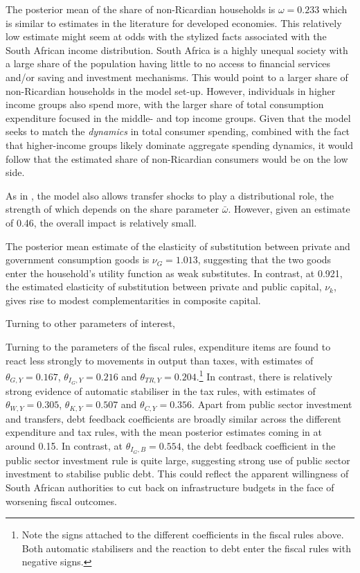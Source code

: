 \documentclass[a4paper,11pt]{article}
\numberwithin{equation}{section}
\begin{document}
	The posterior mean of the share of non-Ricardian households is $\omega=0.233$ which is similar to estimates in the literature for developed economies. This relatively low estimate might seem at odds with the stylized facts associated with the South African income distribution. South Africa is a highly unequal society with a large share of the population having little to no access to financial services and/or saving and investment mechanisms. This would point to a larger share of non-Ricardian households in the model set-up. However, individuals in higher income groups also spend more, with the larger share of total consumption expenditure focused in the middle- and top income groups. Given that the model seeks to match the \textit{dynamics} in total consumer spending, combined with the fact that higher-income groups likely dominate aggregate spending dynamics, it would follow that the estimated share of non-Ricardian consumers would be on the low side.
	
	As in \cite{coenen2013}, the model also allows transfer shocks to play a distributional role, the strength of which depends on the share parameter $\bar{\omega}$. However, given an estimate of 0.46, the overall impact is relatively small.
	
	The posterior mean estimate of the elasticity of substitution between private and government consumption goods is $\nu_G = 1.013$, suggesting that the two goods enter the household's utility function as weak substitutes. In contrast, at 0.921, the estimated elasticity of substitution between private and public capital, $\nu_k$, gives rise to modest complementarities in composite capital.    
	
	Turning to other parameters of interest, 
	
	Turning to the parameters of the fiscal rules, expenditure items are found to react less strongly to movements in output than taxes, with estimates of $\theta_{G,Y}=0.167$, $\theta_{I_G,Y}=0.216$ and $\theta_{TR,Y}=0.204$.\footnote{Note the signs attached to the different coefficients in the fiscal rules above. Both automatic stabilisers and the reaction to debt enter the fiscal rules with negative signs.} In contrast, there is relatively strong evidence of automatic stabiliser in the tax rules, with estimates of $\theta_{W,Y}=0.305$, $\theta_{K,Y}=0.507$ and $\theta_{C,Y}=0.356$. Apart from public sector investment and transfers, debt feedback coefficients are broadly similar across the different expenditure and tax rules, with the mean posterior estimates coming in at around 0.15. In contrast, at $\theta_{I_G,B}=0.554$, the debt feedback coefficient in the public sector investment rule is quite large, suggesting strong use of public sector investment to stabilise public debt. This could reflect the apparent willingness of South African authorities to cut back on infrastructure budgets in the face of worsening fiscal outcomes. 
	
\end{document}
